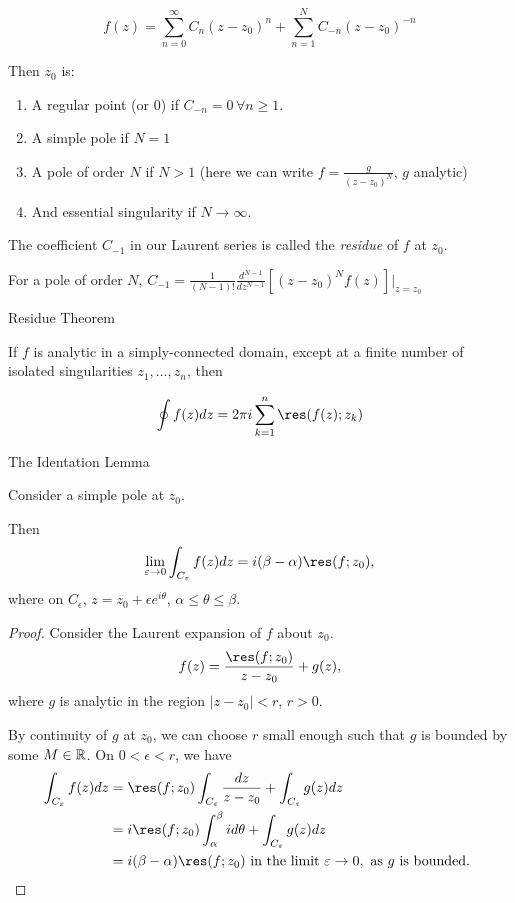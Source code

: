 \documentclass[a4paper]{article}
\begin{document}
\[
	f(z) = \sum_{n=0}^{\infty} C_n (z-z_0)^{n} + \sum_{n=1}^{N} C_{-n} (z-z_0)^{-n}
\]

Then $z_0$ is:

\begin{enumerate}
	\item A regular point (or 0) if $C_{-n} = 0 \, \forall n\ge 1$.\\
	\item A simple pole if $N=1$ \\
	\item A  pole of order  $N$ if $N>1$ (here we can write $f = \frac{g}{(z-z_0)^{N}}$, $g$ analytic)\\
	\item And essential singularity if $N \to \infty$.
\end{enumerate}

The coefficient $C_{-1}$ in our Laurent series is called the \textit{residue} of $f$ at $z_0$.

For a pole of order $N$, $C_{-1} = \frac{1}{(N-1)!} \frac{d^{N-1}}{dz^{N-1}} [(z-z_0)^{N} f(z)]\Bigr\rvert_{z=z_0}$

\begin{thm} Residue Theorem
	
	If $f$ is analytic in a simply-connected domain, except at a finite number of isolated singularities $z_1, \ldots, z_n$, then

\[
	\oint f(z) dz = 2\pi i \sum_{k=1}^{n} \res(f(z); z_k)
\]

\end{thm}

\begin{lemma} The Identation Lemma

	Consider a simple pole at $z_0$.

\begin{figure}[ht]
    \centering
    \caption{}
    \label{indentation}
\end{figure}
	
Then \[
	\lim_{\epsilon \to 0} \int_{C_{\epsilon}} f(z) dz = i(\beta - \alpha) \res(f; z_0)
,\] where on $C_{\epsilon}$, $z = z_0 + \epsilon e^{i \theta}$, $\alpha \le \theta \le \beta$. 
\end{lemma}

\begin{proof}
	
Consider the Laurent expansion of $f$ about $z_0$.
\[
	f(z) = \frac{\res(f; z_0)}{z-z_0} + g(z)
,\] where $g$ is analytic in the region $|z-z_0| < r$, $r>0$.

By continuity of  $g$ at $z_0$, we can choose $r$ small enough such that $g$ is bounded by some $M\in \mathbb{R}$. On $0 < \epsilon < r$, we have 
\begin{align*}
	\int_{C_{\epsilon}} f(z) dz &= \res(f;z_0) \int_{C_{\epsilon}} \frac{dz}{z-z_0} + \int_{C_{\epsilon}} g(z) dz \\
	&= i \res(f;z_0) \int_{\alpha}^{\beta} i d\theta + \int_{C_{\epsilon}} g(z) dz  \\
	&= i(\beta-\alpha) \res(f;z_0) \text{ in the limit } \epsilon \to 0, \text{ as $g$ is bounded. }
\end{align*}

\end{proof}
\end{document}
